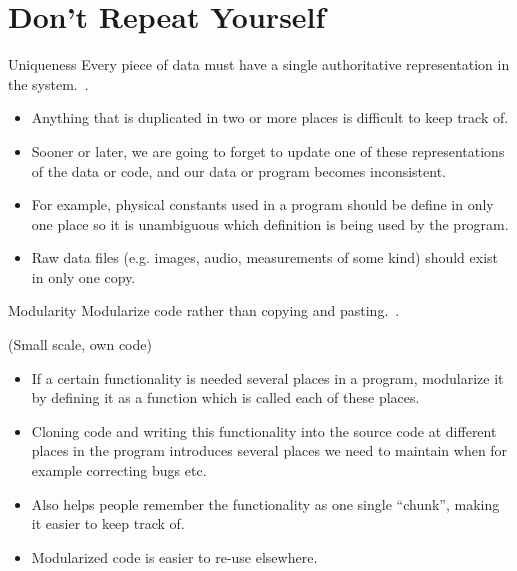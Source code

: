\documentclass[english]{beamer}
\newcommand{\sectionslide}{\centering\vspace*{25mm}%
  {\bfseries\LARGE \insertsection}}
\begin{document}

\section{Don't Repeat Yourself}

\begin{frame}
  \sectionslide
\end{frame}


\begin{frame}{\insertsection}{Uniqueness}
  Every piece of data must have a single authoritative representation
  in the system.~\cite{Wilson2013}.
  \begin{itemize}
  \item Anything that is duplicated in two or more places is difficult
    to keep track of.
  \item Sooner or later, we are going to forget to update one of these
    representations of the data or code, and our data or program
    becomes inconsistent.
  \item For example, physical constants used in a program should be
    define in only one place so it is unambiguous which definition is
    being used by the program.
  \item Raw data files (e.g. images, audio, measurements of some kind)
    should exist in only one copy.
  \end{itemize}
\end{frame}


\begin{frame}{\insertsection}{Modularity}
  Modularize code rather than copying and pasting.~\cite{Wilson2013}.

  (Small scale, own code)
  \begin{itemize}
  \item If a certain functionality is needed several places in a
    program, modularize it by defining it as a function which is
    called each of these places.
  \item Cloning code and writing this functionality into the source
    code at different places in the program introduces several places
    we need to maintain when for example correcting bugs etc.
  \item Also helps people remember the functionality as one single
    ``chunk'', making it easier to keep track of.
  \item Modularized code is easier to re-use elsewhere.
  \end{itemize}
\end{frame}
\end{document}
